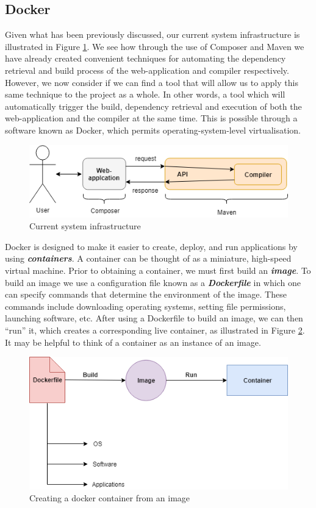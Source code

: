 \documentclass{l4proj}
\begin{document}
\subsection{Docker}
Given what has been previously discussed, our current system infrastructure is illustrated in Figure \ref{fig:maveninfra}. We see how through the use of Composer and Maven we have already created convenient techniques for automating the dependency retrieval and build process of the web-application and compiler respectively. However, we now consider if we can find a tool that will allow us to apply this same technique to the project as a whole. In other words, a tool which will automatically trigger the build, dependency retrieval and execution of both the web-application and the compiler at the same time. This is possible through a software known as Docker, which permits operating-system-level virtualisation.

\begin{figure}[h]
\centering
\includegraphics[scale=0.6]{images/maveninfra.png}
\caption{Current system infrastructure}
\label{fig:maveninfra}	
\end{figure}

Docker is designed to make it easier to create, deploy, and run applications by using \textit{\textbf{containers}}. A container can be thought of as a miniature, high-speed virtual machine. Prior to obtaining a container, we must first build an \textit{\textbf{image}}. To build an image we use a configuration file known as a  \textit{\textbf{Dockerfile}} in which one can specify commands that determine the environment of the image. These commands include downloading operating systems, setting file permissions, launching software, etc. After using a Dockerfile to build an image, we can then ``run'' it, which creates a corresponding live container, as illustrated in Figure \ref{fig:docker1}. It may be helpful to think of a container as an instance of an image. 

\begin{figure}[h]
\centering
\includegraphics[scale=0.5]{images/docker1.png}
\caption{Creating a docker container from an image}
\label{fig:docker1}	
\end{figure}
\end{document}
